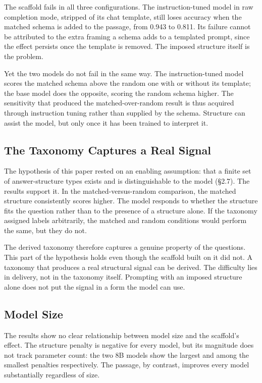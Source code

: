 \documentclass{article}
\begin{document}
The scaffold fails in all three configurations. The instruction-tuned model in raw completion mode, stripped of its chat template, still loses accuracy when the matched schema is added to the passage, from 0.943 to 0.811. Its failure cannot be attributed to the extra framing a schema adds to a templated prompt, since the effect persists once the template is removed. The imposed structure itself is the problem.

Yet the two models do not fail in the same way. The instruction-tuned model scores the matched schema above the random one with or without its template; the base model does the opposite, scoring the random schema higher. The sensitivity that produced the matched-over-random result is thus acquired through instruction tuning rather than supplied by the schema. Structure can assist the model, but only once it has been trained to interpret it.

\subsection{The Taxonomy Captures a Real Signal}

The hypothesis of this paper rested on an enabling assumption: that a finite set of answer-structure types exists and is distinguishable to the model (\S2.7). The results support it. In the matched-versus-random comparison, the matched structure consistently scores higher. The model responds to whether the structure fits the question rather than to the presence of a structure alone. If the taxonomy assigned labels arbitrarily, the matched and random conditions would perform the same, but they do not.

The derived taxonomy therefore captures a genuine property of the questions. This part of the hypothesis holds even though the scaffold built on it did not. A taxonomy that produces a real structural signal can be derived. The difficulty lies in delivery, not in the taxonomy itself. Prompting with an imposed structure alone does not put the signal in a form the model can use.

\subsection{Model Size}

The results show no clear relationship between model size and the scaffold's effect. The structure penalty is negative for every model, but its magnitude does not track parameter count: the two 8B models show the largest and among the smallest penalties respectively. The passage, by contrast, improves every model substantially regardless of size.
\end{document}
